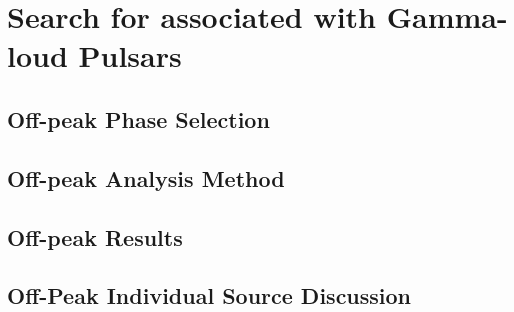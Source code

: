 
\chapter{Search for  associated with Gamma-loud Pulsars}



\section{Off-peak Phase Selection}
\section{Off-peak Analysis Method}
\section{Off-peak Results}
\section{Off-Peak Individual Source Discussion}
